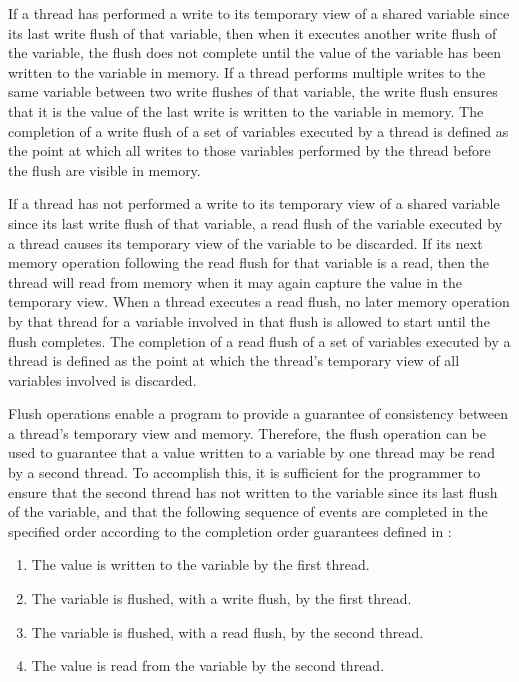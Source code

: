 If a thread has performed a write to its temporary view of a shared variable
since its last write flush of that variable, then when it executes another
write flush of the variable, the flush does not complete until the value of
the variable has been written to the variable in memory.  If a thread performs
multiple writes to the same variable between two write flushes of that
variable, the write flush ensures that it is the value of the last write is
written to the variable in memory. The completion of a write flush of a set of
variables executed by a thread is defined as the point at which all writes to
those variables performed by the thread before the flush are visible in
memory.

If a thread has not performed a write to its temporary view of a shared
variable since its last write flush of that variable, a read flush of the
variable executed by a thread causes its temporary view of the variable to be
discarded. If its next memory operation following the read flush for that
variable is a read, then the thread will read from memory when it may again
capture the value in the temporary view. When a thread executes a read flush,
no later memory operation by that thread for a variable involved in that flush
is allowed to start until the flush completes. The completion of a read flush
of a set of variables executed by a thread is defined as the point at which
the thread's temporary view of all variables involved is discarded.

Flush operations enable a program to provide a guarantee of consistency
between a thread's temporary view and memory. Therefore, the flush operation can
be used to guarantee that a value written to a variable by one thread may be
read by a second thread. To accomplish this, it is sufficient for the
programmer to ensure that the second thread has not written to the variable
since its last flush of the variable, and that the following sequence of
events are completed in the specified order according to the completion order
guarantees defined in : 

\begin{enumerate}
\item The value is written to the variable by the first thread.   

\item The variable is flushed, with a write flush, by the first thread.    

\item The variable is flushed, with a read flush, by the second thread.

\item The value is read from the variable by the second thread.
\end{enumerate}

